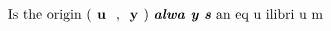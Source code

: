 \documentclass[preview]{standalone}
\begin{document}
\begin{align*}
\text{Is   the   origin   (\textbf{ u } ,   \textbf{ y })   \textbf{\emph{alwa y s}}   an   eq u ilibri u m}
\end{align*}
\end{document}

